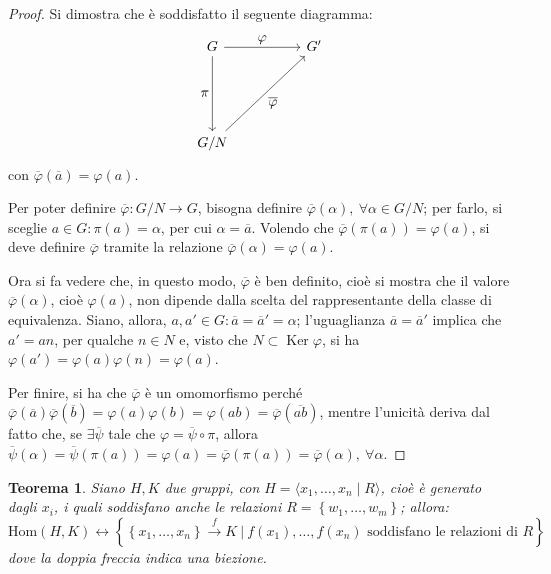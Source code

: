 \documentclass[12pt]{scrartcl}
\theoremstyle{style}
\newtheorem{teorema}{Teorema}[section]
\numberwithin{equation}{subsection}
\begin{document}
\begin{proof}
	Si dimostra che \`e soddisfatto il seguente diagramma:
	\[
	\begin{tikzcd}
		G & & G '\\
		\\
		\\
		 G / N
		\arrow[from=1-1, to=1-3, "\displaystyle \varphi "]
		\arrow[from=1-1, to=4-1, "\displaystyle \pi"']
		\arrow[from=4-1, to=1-3, "\displaystyle \overline{\varphi}"']
	\end{tikzcd}
	\] 
	con $\overline{\varphi }(\overline{a}) = \varphi (a)$.

	Per poter definire $\overline{\varphi } : G / N \to G$, bisogna definire $\overline{\varphi }(\alpha ), \ \forall \alpha \in G / N$; per farlo, si sceglie $a \in G : \pi (a) = \alpha $, per cui $\alpha  = \overline{a}$. 
	Volendo che $\overline{\varphi }(\pi(a)) = \varphi (a)$, si deve definire $\overline{\varphi }$ tramite la relazione $\overline{\varphi }(\alpha ) = \varphi (a)$.

	Ora si fa vedere che, in questo modo, $\overline{\varphi }$ \`e ben definito, cio\`e si mostra che il valore $\overline{\varphi }(\alpha )$, cio\`e $\varphi (a)$, non dipende dalla scelta del rappresentante della classe di equivalenza.
	Siano, allora, $a,a' \in G : \overline{a}= \overline{a}' = \alpha $; l'uguaglianza $\overline{a}=\overline{a}'$ implica che $a' = an$, per qualche $n \in N$ e, visto che $N\subset\operatorname{Ker} \varphi $, si ha $\varphi (a')=\varphi (a)\varphi (n)=\varphi (a)$.

	Per finire, si ha che $\overline{\varphi }$ \`e un omomorfismo perch\'e $\overline{\varphi }(\overline{a})\overline{\varphi }(\overline{b}) = \varphi (a)\varphi (b) = \varphi (ab) = \overline{\varphi }(\overline{ab})$, mentre l'unicit\`a deriva dal fatto che, se $\exists \overline{\psi }$ tale che $\varphi = \overline{\psi }\circ\pi$, allora $\overline{\psi }(\alpha ) = \overline{\psi }(\pi(a)) = \varphi (a) = \overline{\varphi }(\pi(a))=\overline{\varphi }(\alpha ), \ \forall \alpha $.
\end{proof}
\begin{teorema}\label{mitoat}
	Siano $H, K$ due gruppi, con $H = \langle x_1,\ldots,x_n  \mid R \rangle$, cio\`e \`e generato dagli $x_i$, i quali soddisfano anche le relazioni $R=\left\{ w_1,\ldots,w_m \right\} $; allora:
	\[
		\mathrm{Hom} (H,K) \longleftrightarrow
			\left\{ \left\{ x_1,\ldots,x_n \right\} \stackrel{f}{\longrightarrow} K \ \Big\lvert\ f(x_1),\ldots,f(x_n)\text{ soddisfano le relazioni di } R \right\} 
	\] 
	dove la doppia freccia indica una biezione.
\end{teorema}
\end{document}
